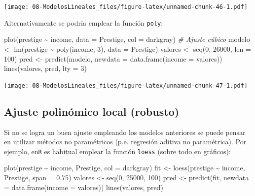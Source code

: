 \documentclass[
]{book}
\newenvironment{Shaded}{\begin{snugshade}}{\end{snugshade}}
\newcommand{\AttributeTok}[1]{\textcolor[rgb]{0.77,0.63,0.00}{#1}}
\newcommand{\CommentTok}[1]{\textcolor[rgb]{0.56,0.35,0.01}{\textit{#1}}}
\newcommand{\DecValTok}[1]{\textcolor[rgb]{0.00,0.00,0.81}{#1}}
\newcommand{\FloatTok}[1]{\textcolor[rgb]{0.00,0.00,0.81}{#1}}
\newcommand{\FunctionTok}[1]{\textcolor[rgb]{0.00,0.00,0.00}{#1}}
\newcommand{\NormalTok}[1]{#1}
\newcommand{\OtherTok}[1]{\textcolor[rgb]{0.56,0.35,0.01}{#1}}
\newcommand{\SpecialCharTok}[1]{\textcolor[rgb]{0.00,0.00,0.00}{#1}}
\newcommand{\StringTok}[1]{\textcolor[rgb]{0.31,0.60,0.02}{#1}}
\theoremstyle{break}
\begin{document}
\texttt{[image: 08-ModelosLineales\_files/figure-latex/unnamed-chunk-46-1.pdf]}

Alternativamente se podría emplear la función \texttt{poly}:

\begin{Shaded}
\begin{Highlighting}[]
\FunctionTok{plot}\NormalTok{(prestige }\SpecialCharTok{\textasciitilde{}}\NormalTok{ income, }\AttributeTok{data =}\NormalTok{ Prestige, }\AttributeTok{col =} \StringTok{\textquotesingle{}darkgray\textquotesingle{}}\NormalTok{)}
\CommentTok{\# Ajuste cúbico}
\NormalTok{modelo }\OtherTok{\textless{}{-}} \FunctionTok{lm}\NormalTok{(prestige }\SpecialCharTok{\textasciitilde{}} \FunctionTok{poly}\NormalTok{(income, }\DecValTok{3}\NormalTok{), }\AttributeTok{data =}\NormalTok{ Prestige)}
\NormalTok{valores }\OtherTok{\textless{}{-}} \FunctionTok{seq}\NormalTok{(}\DecValTok{0}\NormalTok{, }\DecValTok{26000}\NormalTok{, }\AttributeTok{len =} \DecValTok{100}\NormalTok{)}
\NormalTok{pred }\OtherTok{\textless{}{-}} \FunctionTok{predict}\NormalTok{(modelo, }\AttributeTok{newdata =} \FunctionTok{data.frame}\NormalTok{(}\AttributeTok{income =}\NormalTok{ valores))}
\FunctionTok{lines}\NormalTok{(valores, pred, }\AttributeTok{lty =} \DecValTok{3}\NormalTok{) }
\end{Highlighting}
\end{Shaded}

\texttt{[image: 08-ModelosLineales\_files/figure-latex/unnamed-chunk-47-1.pdf]}

\hypertarget{ajuste-polinuxf3mico-local-robusto}{%
\subsection{Ajuste polinómico local (robusto)}\label{ajuste-polinuxf3mico-local-robusto}}

Si no se logra un buen ajuste empleando los modelos anteriores se puede pensar en
utilizar métodos no paramétricos (p.e. regresión aditiva no paramétrica). Por ejemplo,
en\texttt{R} es habitual emplear la función \texttt{loess} (sobre todo en gráficos):

\begin{Shaded}
\begin{Highlighting}[]
\FunctionTok{plot}\NormalTok{(prestige }\SpecialCharTok{\textasciitilde{}}\NormalTok{ income, Prestige, }\AttributeTok{col =} \StringTok{\textquotesingle{}darkgray\textquotesingle{}}\NormalTok{)}
\NormalTok{fit }\OtherTok{\textless{}{-}} \FunctionTok{loess}\NormalTok{(prestige }\SpecialCharTok{\textasciitilde{}}\NormalTok{ income, Prestige, }\AttributeTok{span =} \FloatTok{0.75}\NormalTok{)}
\NormalTok{valores }\OtherTok{\textless{}{-}} \FunctionTok{seq}\NormalTok{(}\DecValTok{0}\NormalTok{, }\DecValTok{25000}\NormalTok{, }\DecValTok{100}\NormalTok{)}
\NormalTok{pred }\OtherTok{\textless{}{-}} \FunctionTok{predict}\NormalTok{(fit, }\AttributeTok{newdata =} \FunctionTok{data.frame}\NormalTok{(}\AttributeTok{income =}\NormalTok{ valores))}
\FunctionTok{lines}\NormalTok{(valores, pred)}
\end{Highlighting}
\end{Shaded}
\end{document}
